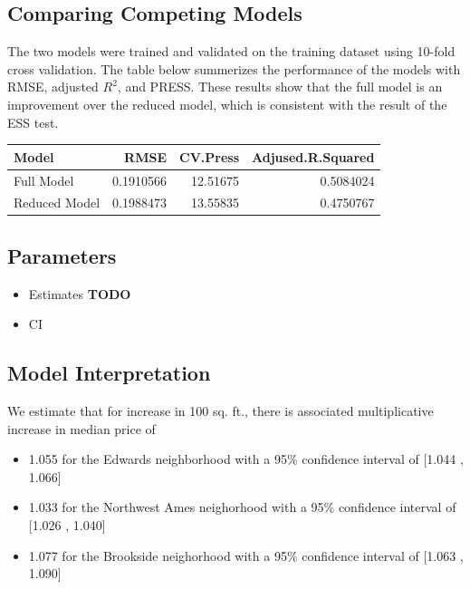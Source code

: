 \documentclass[american,]{article}
\providecommand{\tightlist}{%
  \setlength{\itemsep}{0pt}\setlength{\parskip}{0pt}}
\begin{document}
\hypertarget{comparing-competing-models}{%
\subsection{Comparing Competing
Models}\label{comparing-competing-models}}

The two models were trained and validated on the training dataset using
10-fold cross validation. The table below summerizes the performance of
the models with RMSE, adjusted \(R^2\), and PRESS. These results show
that the full model is an improvement over the reduced model, which is
consistent with the result of the ESS test.

\begin{table}[H]
\centering
\begin{tabular}{lrrr}
\toprule
Model & RMSE & CV.Press & Adjused.R.Squared\\
\midrule
Full Model & 0.1910566 & 12.51675 & 0.5084024\\
Reduced Model & 0.1988473 & 13.55835 & 0.4750767\\
\bottomrule
\end{tabular}
\end{table}

\hypertarget{parameters}{%
\subsection{Parameters}\label{parameters}}

\begin{itemize}
\tightlist
\item
  Estimates \textbf{TODO}
\item
  CI
\end{itemize}

\hypertarget{model-interpretation}{%
\subsection{Model Interpretation}\label{model-interpretation}}

We estimate that for increase in 100 sq. ft., there is associated
multiplicative increase in median price of

\begin{itemize}
\tightlist
\item
  1.055 for the Edwards neighborhood with a 95\% confidence interval of
  {[}1.044 , 1.066{]}
\item
  1.033 for the Northwest Ames neighorhood with a 95\% confidence
  interval of {[}1.026 , 1.040{]}
\item
  1.077 for the Brookside neighorhood with a 95\% confidence interval of
  {[}1.063 , 1.090{]}
\end{itemize}
\end{document}
